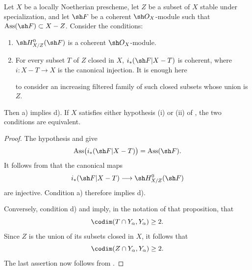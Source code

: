 \begin{corollary}[5.11.5]
\label{IV.5.11.5}
Let $X$ be a locally Noetherian prescheme, let $Z$ be a subset
of $X$ stable under specialization, and let $\sh F$ be a coherent
$\sh O_X$-module such that
$\operatorname{Ass}(\sh F)\subset X-Z$.  Consider the conditions:
\begin{enumerate}[{\rm a)}]
  \item $\sh H^0_{X/Z}(\sh F)$ is a coherent
  $\sh O_X$-module.
  \item[{\rm d)}] For every subset $T$ of $Z$ closed in $X$,
  $i_*(\sh F|X-T)$ is coherent, where
  $i:X-T\to X$ is the canonical injection.  It is enough here


  to consider an increasing filtered family of such closed
  subsets whose union is $Z$.
\end{enumerate}
Then {\rm a)} implies {\rm d)}.  If $X$ satisfies either
hypothesis {\rm(i)} or {\rm(ii)} of , the two
conditions are equivalent.
\end{corollary}

\begin{proof}
The hypothesis and  give
\[
  \operatorname{Ass}\bigl(i_*(\sh F|X-T)\bigr)
  =\operatorname{Ass}(\sh F).
\]
It follows from  that the canonical maps
\[
  i_*(\sh F|X-T)\longrightarrow\sh H^0_{X/Z}(\sh F)
\]
are injective.  Condition {\rm a)} therefore implies {\rm d)}.

Conversely, condition {\rm d)} and  imply, in
the notation of that proposition, that
\[
  \codim(T\cap Y_\alpha,Y_\alpha)\geq2.
\]
Since $Z$ is the union of its subsets closed in $X$, it follows
that
\[
  \codim(Z\cap Y_\alpha,Y_\alpha)\geq2.
\]
The last assertion now follows from .
\end{proof}

